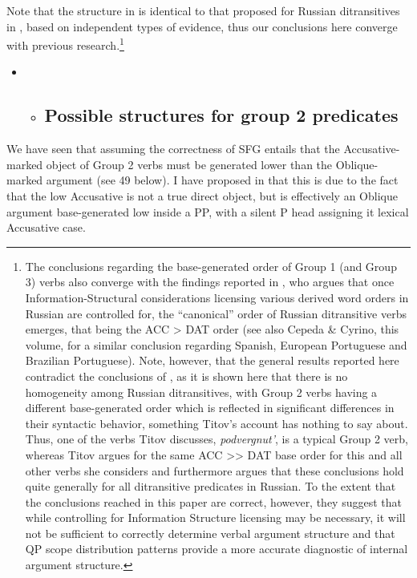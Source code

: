 \documentclass[output=paper,modfonts, nonflat]{langsci/langscibook}
\begin{document}
\begin{styleinnerExample}
Note that the structure in  is identical to that proposed for Russian ditransitives in \citet{Bailyn1995},  based on independent types of evidence, thus our conclusions here converge with previous research.\footnote{The conclusions regarding the base-generated order of Group 1 (and Group 3) verbs also converge with the findings reported in \citet{Titov2017}, who argues that once Information-Structural considerations licensing various derived word orders in Russian are controlled for, the “canonical” order of Russian ditransitive verbs emerges, that being the ACC > DAT order (see also Cepeda \& Cyrino, this volume, for a similar conclusion regarding Spanish, European Portuguese and Brazilian Portuguese). Note, however, that the general results reported here contradict the conclusions of \citet{Titov2017}, as it is shown here that there is no homogeneity among Russian ditransitives, with Group 2 verbs having a different base-generated order which is reflected in significant differences in their syntactic behavior, something Titov’s account has nothing to say about. Thus, one of the verbs Titov discusses, \textit{podvergnut’}, is a typical Group 2 verb, whereas Titov argues for the same ACC >> DAT base order for this and all other verbs she considers and furthermore argues that these conclusions hold quite generally for all ditransitive predicates in Russian. To the extent that the conclusions reached in this paper are correct, however, they suggest that while controlling for Information Structure licensing may be necessary, it will not be sufficient to correctly determine verbal argument structure and that QP scope distribution patterns provide a more accurate diagnostic of internal argument structure.} 

\begin{itemize}
\item \begin{itemize}
\item \subsection{Possible structures for group 2 predicates}
\end{itemize}
\end{itemize}

We have seen that assuming the correctness of SFG entails that the Accusative-marked object of Group 2 verbs must be generated lower than the Oblique-marked argument (see 49 below). I have proposed in \citet{Antonyuk2015} that this is due to the fact that the low Accusative is not a true direct object, but is effectively an Oblique argument base-generated low inside a PP, with a silent P head assigning it lexical Accusative case. 


\end{styleinnerExample}
\end{document}
